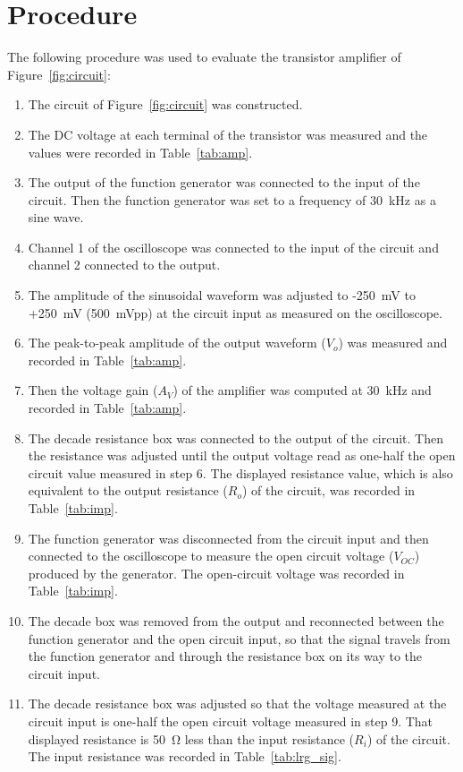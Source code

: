 \section{Procedure}
The following procedure was used to evaluate the transistor amplifier of Figure~\ref{fig:circuit}:

\begin{enumerate}
\item The circuit of Figure~\ref{fig:circuit} was constructed.
\item The DC voltage at each terminal of the transistor was measured and the values were recorded in Table~\ref{tab:amp}.
\item The output of the function generator was connected to the input of the circuit. Then the function generator was set to a frequency of \SI{30}{\kilo\hertz} as a sine wave.
\item Channel 1 of the oscilloscope was connected to the input of the circuit and channel 2 connected to the output.
\item The amplitude of the sinusoidal waveform was adjusted to -\SI{250}{mV} to +\SI{250}{mV} (\SI{500}{mVpp}) at the circuit input as measured on the oscilloscope.
\item The peak-to-peak amplitude of the output waveform ($V_o$) was measured and recorded in Table~\ref{tab:amp}.
\item Then the voltage gain ($A_V$) of the amplifier was computed at \SI{30}{\kilo\hertz} and recorded in Table~\ref{tab:amp}.
\item The decade resistance box was connected to the output of the circuit. Then the resistance was adjusted until the output voltage read as one-half the open circuit value measured in step 6. The displayed resistance value, which is also equivalent to the output resistance ($R_o$) of the circuit, was recorded in Table~\ref{tab:imp}.
\item The function generator was disconnected from the circuit input and then connected to the oscilloscope to measure the open circuit voltage ($V_{OC}$) produced by the generator. The open-circuit voltage was recorded in Table~\ref{tab:imp}.
\item The decade box was removed from the output and reconnected between the function generator and the open circuit input, so that the signal travels from the function generator and through the resistance box on its way to the circuit input.
\item The decade resistance box was adjusted so that the voltage measured at the circuit input is one-half the open circuit voltage measured in step 9. That displayed resistance is \SI{50}{\ohm} less than the input resistance ($R_i$) of the circuit. The input resistance was recorded in Table~\ref{tab:lrg_sig}.

\end{enumerate}
